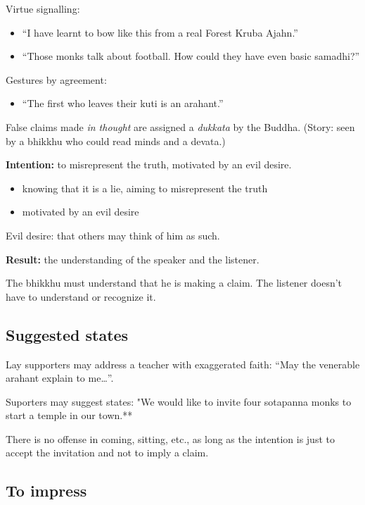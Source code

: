 Virtue signalling:

\begin{itemize}
\tightlist
\item
  ``I have learnt to bow like this from a real Forest Kruba Ajahn.''
\item
  ``Those monks talk about football. How could they have even basic
  samadhi?''
\end{itemize}

Gestures by agreement:

\begin{itemize}
\tightlist
\item
  ``The first who leaves their kuti is an arahant.''
\end{itemize}

False claims made \emph{in thought} are assigned a \emph{dukkata} by the
Buddha. (Story: seen by a bhikkhu who could read minds and a devata.)

\textbf{Intention:} to misrepresent the truth, motivated by an evil
desire.

\begin{itemize}
\tightlist
\item
  knowing that it is a lie, aiming to misrepresent the truth
\item
  motivated by an evil desire
\end{itemize}

Evil desire: that others may think of him as such.

\textbf{Result:} the understanding of the speaker and the listener.

The bhikkhu must understand that he is making a claim. The listener
doesn't have to understand or recognize it.

\subsection{Suggested states}

Lay supporters may address a teacher with exaggerated faith: ``May the
venerable arahant explain to me\ldots{}''.

Suporters may suggest states: "We would like to invite four sotapanna
monks to start a temple in our town.**

There is no offense in coming, sitting, etc., as long as the intention
is just to accept the invitation and not to imply a claim.

\subsection{To impress}


